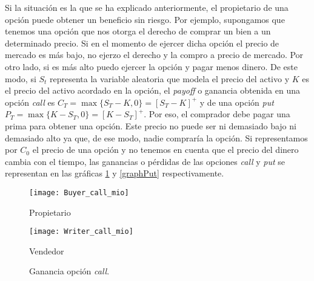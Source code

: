 Si la situación es la que se ha explicado anteriormente, el propietario de una opción puede obtener un beneficio sin riesgo. Por ejemplo, supongamos que tenemos una opción que nos otorga el derecho de comprar un bien a un determinado precio. Si en el momento de ejercer dicha opción el precio de mercado es más bajo, no ejerzo el derecho y la compro a precio de mercado. Por otro lado, si es más alto puedo ejercer la opción y pagar menos dinero. De este modo, si $ S_t $ representa la variable aleatoria que modela el precio del activo y $ K $ es el precio del activo acordado en la opción, el \textit{payoff} o ganancia obtenida en una opción \textit{call} es $ C_T = \max\{S_T-K, 0\} = \left[S_T - K\right]^+ $ y de una opción \textit{put} $ P_T = \max\{K-S_T, 0\} = \left[K-S_T\right]^+ $. Por eso, el comprador debe pagar una prima para obtener una opción. Este precio no puede ser ni demasiado bajo ni demasiado alto ya que, de ese modo, nadie compraría la opción. Si representamos por $ C_0 $ el precio de una opción y no tenemos en cuenta que el precio del dinero cambia con el tiempo, las ganancias o pérdidas de las opciones \textit{call} y \textit{put} se representan en las gráficas \ref{graphCall} y \ref{graphPut} respectivamente.  \\

\begin{figure}[h!]
	\begin{minipage}{0.5\textwidth}
		\centering
		\texttt{[image: Buyer\_call\_mio]} 
		\caption*{Propietario}
	\end{minipage}
	\begin{minipage}{0.5\textwidth}
		\texttt{[image: Writer\_call\_mio]}
		\caption*{Vendedor}
		
	\end{minipage}
	\caption{Ganancia opción \textit{call}.}
	\label{graphCall}
\end{figure}

